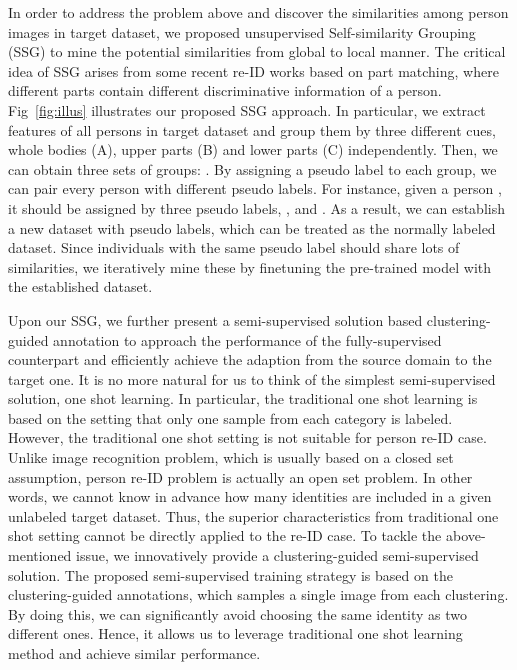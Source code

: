 \documentclass[10pt,twocolumn,letterpaper]{article}
\begin{document}
In order to address the problem above and discover the similarities among person images in target dataset, we proposed unsupervised Self-similarity Grouping (SSG) to mine the potential similarities from global to local manner. The critical idea of SSG arises from some recent re-ID works based on part matching, where different parts contain different discriminative information of a person. Fig~\ref{fig:illus} illustrates our proposed SSG approach. In particular, we extract features of all persons in target dataset and group them by three different cues, whole bodies (A), upper parts (B) and lower parts (C) independently. Then, we can obtain three sets of groups: . By assigning a pseudo label to each group, we can pair every person with different pseudo labels. For instance, given a person , it should be assigned by three pseudo labels, ,  and . As a result, we can establish a new dataset with pseudo labels, which can be treated as the normally labeled dataset. Since individuals with the same pseudo label should share lots of similarities, we iteratively mine these by finetuning the pre-trained model with the established dataset.

Upon our SSG, we further present a semi-supervised solution based clustering-guided annotation to approach the performance of the fully-supervised counterpart and efficiently achieve the adaption from the source domain to the target one. It is no more natural for us to think of the simplest semi-supervised solution, \ie one shot learning. In particular, the traditional one shot learning is based on the setting that only one sample from each category is labeled. However, the traditional one shot setting is not suitable for person re-ID case. Unlike image recognition problem, which is usually based on a closed set assumption, person re-ID problem is actually an open set problem. In other words, we cannot know in advance how many identities are included in a given unlabeled target dataset. Thus, the superior characteristics from traditional one shot setting cannot be directly applied to the re-ID case. To tackle the above-mentioned issue, we innovatively provide a clustering-guided semi-supervised solution.
The proposed semi-supervised training strategy is based on the clustering-guided annotations, which samples a single image from each clustering. By doing this, we can significantly avoid choosing the same identity as two different ones. Hence, it allows us to leverage traditional one shot learning method and achieve similar performance.
\end{document}
